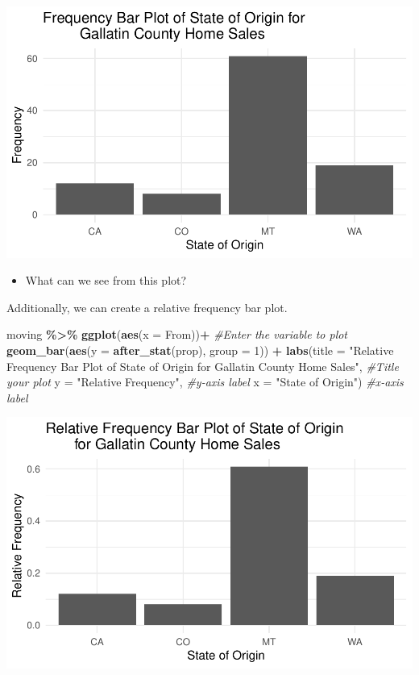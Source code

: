 \documentclass[
]{report}
\newenvironment{Shaded}{\begin{snugshade}}{\end{snugshade}}
\newcommand{\AttributeTok}[1]{\textcolor[rgb]{0.13,0.29,0.53}{#1}}
\newcommand{\CommentTok}[1]{\textcolor[rgb]{0.56,0.35,0.01}{\textit{#1}}}
\newcommand{\DecValTok}[1]{\textcolor[rgb]{0.00,0.00,0.81}{#1}}
\newcommand{\FunctionTok}[1]{\textcolor[rgb]{0.13,0.29,0.53}{\textbf{#1}}}
\newcommand{\NormalTok}[1]{#1}
\newcommand{\SpecialCharTok}[1]{\textcolor[rgb]{0.81,0.36,0.00}{\textbf{#1}}}
\newcommand{\StringTok}[1]{\textcolor[rgb]{0.31,0.60,0.02}{#1}}
\providecommand{\tightlist}{%
  \setlength{\itemsep}{0pt}\setlength{\parskip}{0pt}}
\begin{document}
\begin{center}\includegraphics[width=0.65\linewidth]{03-LN03-EDA_files/figure-latex/unnamed-chunk-6-1} \end{center}

\begin{itemize}
\tightlist
\item
  What can we see from this plot?
\end{itemize}

\vspace{0.3in}

Additionally, we can create a relative frequency bar plot.

\begin{Shaded}
\begin{Highlighting}[]
\NormalTok{moving }\SpecialCharTok{\%\textgreater{}\%}
  \FunctionTok{ggplot}\NormalTok{(}\FunctionTok{aes}\NormalTok{(}\AttributeTok{x =}\NormalTok{ From))}\SpecialCharTok{+} \CommentTok{\#Enter the variable to plot}
  \FunctionTok{geom\_bar}\NormalTok{(}\FunctionTok{aes}\NormalTok{(}\AttributeTok{y =} \FunctionTok{after\_stat}\NormalTok{(prop), }\AttributeTok{group =} \DecValTok{1}\NormalTok{)) }\SpecialCharTok{+}
  \FunctionTok{labs}\NormalTok{(}\AttributeTok{title =} \StringTok{"Relative Frequency Bar Plot of State of Origin }
\StringTok{       for Gallatin County Home Sales"}\NormalTok{, }
       \CommentTok{\#Title your plot}
       \AttributeTok{y =} \StringTok{"Relative Frequency"}\NormalTok{, }\CommentTok{\#y{-}axis label}
       \AttributeTok{x =} \StringTok{"State of Origin"}\NormalTok{) }\CommentTok{\#x{-}axis label}
\end{Highlighting}
\end{Shaded}

\begin{center}\includegraphics[width=0.65\linewidth]{03-LN03-EDA_files/figure-latex/unnamed-chunk-7-1} \end{center}
\end{document}
